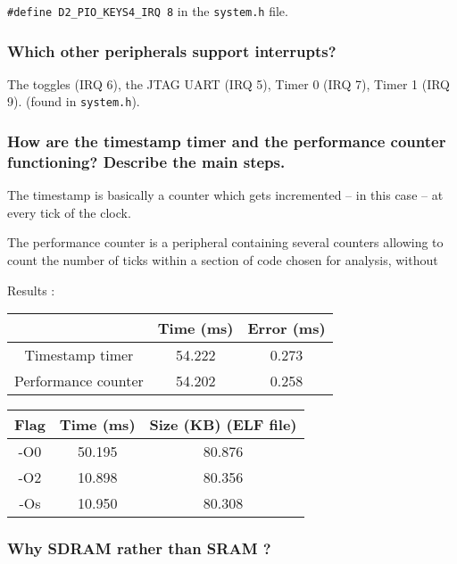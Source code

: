 \documentclass[a4paper,10pt]{article}
\begin{document}
\texttt{\#define D2\_PIO\_KEYS4\_IRQ 8} in the \texttt{system.h} file.

\subsubsection{Which other peripherals support interrupts?}

The toggles (IRQ 6), the JTAG UART (IRQ 5), Timer 0 (IRQ 7), Timer 1 (IRQ 9).
(found in \texttt{system.h}).


\setcounter{section}{5}
\setcounter{subsection}{1}
\setcounter{subsubsection}{0}

\subsubsection{How are the timestamp timer and the performance counter functioning? Describe the main steps.}

The timestamp is basically a counter which gets incremented -- in this case -- at every tick of the clock.

The performance counter is a peripheral containing several counters allowing to count the number of ticks within a section of code chosen for analysis, without 



Results :

\begin{tabular}{c||c|c}
    & Time (ms) & Error (ms) \\
    \hline
    \hline
    Timestamp timer & 54.222 & 0.273 \\
    \hline
    Performance counter & 54.202 & 0.258
\end{tabular}



\begin{tabular}{c||c|c}
    Flag & Time (ms) & Size (KB) (ELF file) \\
    \hline
    \hline
    -O0 & 50.195 & 80.876 \\
    \hline
    -O2 & 10.898 & 80.356\\
    \hline
    -Os & 10.950 & 80.308
\end{tabular}

\setcounter{subsection}{3}
\setcounter{subsubsection}{0}

\subsubsection{Why SDRAM rather than SRAM ?}
\end{document}
